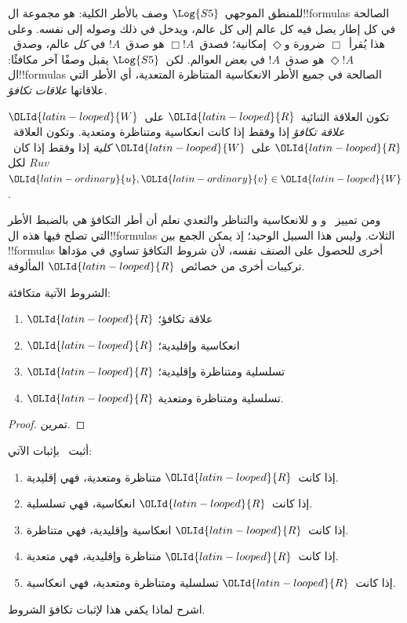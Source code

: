 \documentclass[../../../include/open-logic-section]{subfiles}
\begin{document}


للمنطق الموجهي~$\Log{S5}$ وصف بالأطر الكلية: هو مجموعة
ال!!{formula}s الصالحة في كل إطار يصل فيه كل عالم إلى كل عالم،
ويدخل في ذلك وصوله إلى نفسه. وعلى هذا يُقرأ~$\Box$ ضرورة
و$\Diamond$ إمكانية؛ فصدق~$\Box !A$ هو صدق~$!A$ في \emph{كل}
عالم، وصدق~$\Diamond !A$ هو صدق~$!A$ في \emph{بعض} العوالم.
لكن~$\Log{S5}$ يقبل وصفًا آخر مكافئًا: ال!!{formula}s الصالحة
في جميع الأطر الانعكاسية المتناظرة المتعدية، أي الأطر التي علاقاتها
\emph{علاقات تكافؤ}.

\begin{defn}
  تكون العلاقة الثنائية~$\OLId{latin-looped}{R}$ على~$\OLId{latin-looped}{W}$ \emph{علاقة تكافؤ} إذا وفقط إذا
  كانت انعكاسية ومتناظرة ومتعدية. وتكون العلاقة~$\OLId{latin-looped}{R}$ على~$\OLId{latin-looped}{W}$
  \emph{كلية} إذا وفقط إذا كان~$Ruv$ لكل~$\OLId{latin-ordinary}{u},\OLId{latin-ordinary}{v} \in \OLId{latin-looped}{W}$.
\end{defn}

ومن تمييز~ و و للانعكاسية والتناظر والتعدي
نعلم أن أطر التكافؤ هي بالضبط الأطر التي تصلح فيها هذه
ال!!{formula}s الثلاث. وليس هذا السبيل الوحيد؛ إذ يمكن الجمع
بين !!{formula}s أخرى للحصول على الصنف نفسه، لأن شروط التكافؤ
تساوي في مؤداها تركيبات أخرى من خصائص~$\OLId{latin-looped}{R}$ المألوفة.

\begin{prop}
  الشروط الآتية متكافئة:
  \begin{enumerate}
  \item $\OLId{latin-looped}{R}$ علاقة تكافؤ؛
  \item $\OLId{latin-looped}{R}$ انعكاسية وإقليدية؛
  \item $\OLId{latin-looped}{R}$ تسلسلية ومتناظرة وإقليدية؛
  \item $\OLId{latin-looped}{R}$ تسلسلية ومتناظرة ومتعدية.
  \end{enumerate}
\end{prop}

\begin{proof}
  تمرين.
\end{proof}

\begin{prob}
  أثبت~ بإثبات الآتي:
  \begin{enumerate}
  \item إذا كانت~$\OLId{latin-looped}{R}$ متناظرة ومتعدية، فهي إقليدية.
  \item إذا كانت~$\OLId{latin-looped}{R}$ انعكاسية، فهي تسلسلية.
  \item إذا كانت~$\OLId{latin-looped}{R}$ انعكاسية وإقليدية، فهي متناظرة.
  \item إذا كانت~$\OLId{latin-looped}{R}$ متناظرة وإقليدية، فهي متعدية.
  \item إذا كانت~$\OLId{latin-looped}{R}$ تسلسلية ومتناظرة ومتعدية، فهي انعكاسية.
  \end{enumerate}
  اشرح لماذا يكفي هذا لإثبات تكافؤ الشروط.
\end{prob}
\end{document}
